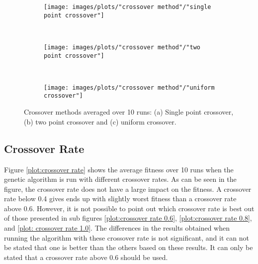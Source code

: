\begin{figure}[h!]
    \centering
    \begin{subfigure}[b]{0.31\textwidth}
        \texttt{[image: images/plots/"crossover method"/"single point crossover"]}
        \caption{}
        \hfill
        \label{plot:single point crossover}
    \end{subfigure}
    ~
    \begin{subfigure}[b]{0.31\textwidth}
        \texttt{[image: images/plots/"crossover method"/"two point crossover"]}
        \caption{}
        \hfill
        \label{plot:two point crossover}
    \end{subfigure}
    ~
    \begin{subfigure}[b]{0.31\textwidth}
        \texttt{[image: images/plots/"crossover method"/"uniform crossover"]}
        \caption{}
        \hfill
        \label{plot:uniform crossover}
    \end{subfigure}
    \caption{Crossover methods averaged over 10 runs: (a) Single point crossover, (b) two point crossover and (c) uniform crossover.}
    \label{plot:crossover methods}
\end{figure}


\subsection{Crossover Rate}
Figure \ref{plot:crossover rate} shows the average fitness over 10 runs when the genetic algorithm is run with different crossover rates. As can be seen in the figure, the crossover rate does not have a large impact on the fitness. A crossover rate below 0.4 gives ends up with slightly worst fitness than a crossover rate above 0.6. However, it is not possible to point out which crossover rate is best out of those presented in sub figures \ref{plot:crossover rate 0.6}, \ref{plot:crossover rate 0.8}, and \ref{plot: crossover rate 1.0}. The differences in the results obtained when running the algorithm with these crossover rate is not significant, and it can not be stated that one is better than the others based on these results. It can only be stated that a crossover rate above 0.6 should be used. \\


